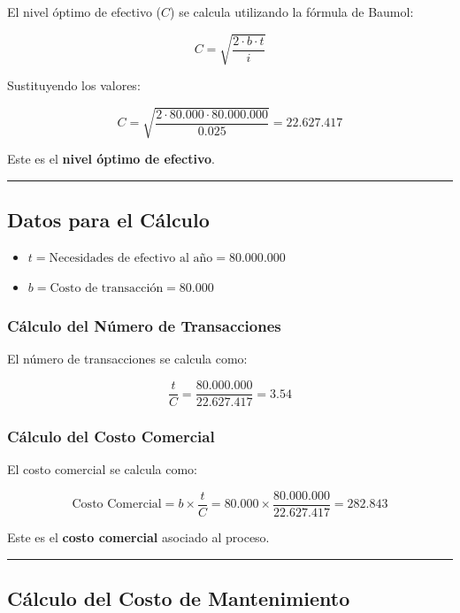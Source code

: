 \documentclass[
  letterpaper,
  DIV=11,
  numbers=noendperiod]{scrartcl}
\providecommand{\tightlist}{%
  \setlength{\itemsep}{0pt}\setlength{\parskip}{0pt}}\usepackage{longtable,booktabs,array}
\begin{document}
El nivel óptimo de efectivo (\(C\)) se calcula utilizando la fórmula de
Baumol:

\[
C = \sqrt{\frac{2 \cdot b \cdot t}{i}}
\]

Sustituyendo los valores:

\[
C = \sqrt{\frac{2 \cdot 80.000 \cdot 80.000.000}{0.025}} = 22.627.417
\]

Este es el \textbf{nivel óptimo de efectivo}.

\begin{center}\rule{0.5\linewidth}{0.5pt}\end{center}

\subsection{Datos para el Cálculo}\label{datos-para-el-cuxe1lculo}

\begin{itemize}
\tightlist
\item
  \(t = \text{Necesidades de efectivo al año} = 80.000.000\)
\item
  \(b = \text{Costo de transacción} = 80.000\)
\end{itemize}

\subsubsection{Cálculo del Número de
Transacciones}\label{cuxe1lculo-del-nuxfamero-de-transacciones}

El número de transacciones se calcula como:

\[
\frac{t}{C} = \frac{80.000.000}{22.627.417} = 3.54
\]

\subsubsection{Cálculo del Costo
Comercial}\label{cuxe1lculo-del-costo-comercial}

El costo comercial se calcula como:

\[
\text{Costo Comercial} = b \times \frac{t}{C} = 80.000 \times \frac{80.000.000}{22.627.417} = 282.843
\]

Este es el \textbf{costo comercial} asociado al proceso.

\begin{center}\rule{0.5\linewidth}{0.5pt}\end{center}

\subsection{Cálculo del Costo de
Mantenimiento}\label{cuxe1lculo-del-costo-de-mantenimiento}
\end{document}
